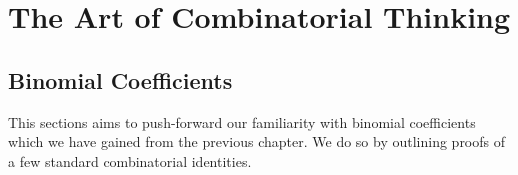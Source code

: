 \chapter{The Art of Combinatorial Thinking}
\section{Binomial Coefficients}
This sections aims to push-forward our familiarity with binomial coefficients which we have gained from the previous chapter. We do so by outlining proofs of a few standard combinatorial identities. 

\begin{comment}
\begin{question}
3a
\end{question}
You have $2n$ objects
Divide the objects into two classes
Each class has  $n$ objects
Choose  $k$ objetcs from class  $A$
Choose  $n-k$ objects from class  $B$
Choose a distinguished element from the k choices of objects from class  $A$
==
Choose the distinguished element from $A$ first <=> n
Choose the rest of the elements from  $A\cup B \backslash \{x\}$ where  $x$ is the distinguised elements <=> \binom{2n-1}{n-1}

\begin{question}
3b
\end{question}
Think along subsets

\begin{question}
\sum_{i=1}^{n}i(n-1) = \\sum_{i=1}^{n}\binom{i}{2} = \sum_{i=0}^{n-2}\binom{n-i}{2} = \binom{n+1}{3} 
\end{question}
Three numbers out of the $n+1$ choices say $a_{1}<a_{2}<a_{3}$. Now argue for the first three sums based on which one of these is chosen first. 

The first sum corresponds to choosing $a_2$. The second sum corresponds to choosing  $a_{3}$. The third sum corresponds to choosing $a_{1}$.

\begin{question}
	For all $n\geq r\geq 0$ we have 
	 \[
		 \binom{r}{r}+\binom{r+1}{r}+\cdots+\binom{n}{r} = \binom{n+1}{r+1}
	.\] 
\end{question}
Give a proof using lattice paths. 
RHS is the number of lattice paths from $(0,0)\to (r+1,n-r)$. For the LHS what happens before the last E step.

The idea is not always to prove equalities. Infact more often than not we will be interested in proving inequalities
 \begin{question}
	 \binom{2n}{n}<4^n
\end{question}
Convert binary to lattice: 0 to N, 1 to E and so on.


\end{comment}
